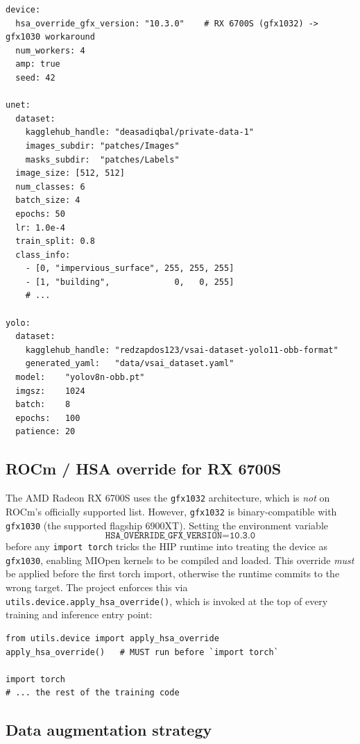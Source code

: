 \documentclass[11pt,a4paper]{article}
\begin{document}
\begin{lstlisting}[style=yaml, caption={Excerpt of \texttt{config.yaml}.}, label={lst:config}]
device:
  hsa_override_gfx_version: "10.3.0"    # RX 6700S (gfx1032) -> gfx1030 workaround
  num_workers: 4
  amp: true
  seed: 42

unet:
  dataset:
    kagglehub_handle: "deasadiqbal/private-data-1"
    images_subdir: "patches/Images"
    masks_subdir:  "patches/Labels"
  image_size: [512, 512]
  num_classes: 6
  batch_size: 4
  epochs: 50
  lr: 1.0e-4
  train_split: 0.8
  class_info:
    - [0, "impervious_surface", 255, 255, 255]
    - [1, "building",             0,   0, 255]
    # ...

yolo:
  dataset:
    kagglehub_handle: "redzapdos123/vsai-dataset-yolo11-obb-format"
    generated_yaml:   "data/vsai_dataset.yaml"
  model:    "yolov8n-obb.pt"
  imgsz:    1024
  batch:    8
  epochs:   100
  patience: 20
\end{lstlisting}

\subsection{ROCm / HSA override for RX 6700S}

The AMD Radeon RX 6700S uses the \texttt{gfx1032} architecture, which is
\emph{not} on ROCm's officially supported list. However, \texttt{gfx1032} is
binary-compatible with \texttt{gfx1030} (the supported flagship 6900XT). Setting
the environment variable
\[
  \texttt{HSA\_OVERRIDE\_GFX\_VERSION=10.3.0}
\]
before any \texttt{import torch} tricks the HIP runtime into treating the device
as \texttt{gfx1030}, enabling MIOpen kernels to be compiled and loaded.
This override \emph{must} be applied before the first torch import, otherwise
the runtime commits to the wrong target. The project enforces this via
\texttt{utils.device.apply\_hsa\_override()}, which is invoked at the top of
every training and inference entry point:

\begin{lstlisting}[style=python, caption={Top of \texttt{train/train\_unet.py}.}]
from utils.device import apply_hsa_override
apply_hsa_override()   # MUST run before `import torch`

import torch
# ... the rest of the training code
\end{lstlisting}

\subsection{Data augmentation strategy}
\end{document}
